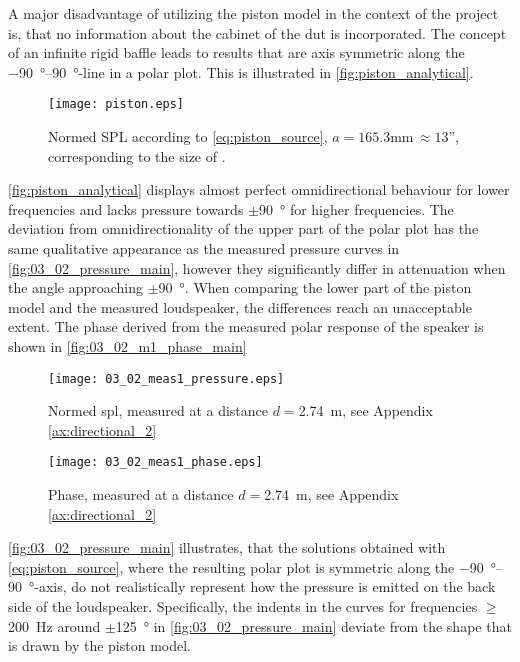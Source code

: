 A major disadvantage of utilizing the piston model in the context of the project is, that no information about the cabinet of the \gls{dut} is incorporated. The concept of an infinite rigid baffle leads to results that are axis symmetric along the \SIrange{-90}{90}{\degree}-line in a polar plot. This is illustrated in \autoref{fig:piston_analytical}.
\begin{figure}[H]
	\centering
	\texttt{[image: piston.eps]}
	\caption{Normed SPL according to \autoref{eq:piston_source}, $a=165.3$\si{\milli\meter}$\,\approx 13$'', corresponding to the size of \citep{seas33}.}
		\label{fig:piston_analytical}
\end{figure}
\autoref{fig:piston_analytical} displays almost perfect omnidirectional behaviour for lower frequencies and lacks pressure towards $\pm$\SI{90}{\degree} for higher frequencies. The deviation from omnidirectionality of the upper part of the polar plot has the same qualitative appearance as the measured pressure curves in \autoref{fig:03_02_pressure_main}, however they significantly differ in attenuation when the angle approaching $\pm$\SI{90}{\degree}. When comparing the lower part of the piston model and the measured loudspeaker, the differences reach an unacceptable extent. The phase derived from the measured polar response of the speaker is shown in  \autoref{fig:03_02_m1_phase_main}  
\begin{figure}[H]
	\centering
	\texttt{[image: 03\_02\_meas1\_pressure.eps]}
	\caption{Normed \gls{spl}, measured at a distance \(d=\)\SI{2.74}{\meter}, see Appendix \ref{ax:directional_2}}
		\label{fig:03_02_pressure_main}
\end{figure}

\begin{figure}[H]
	\centering
	\texttt{[image: 03\_02\_meas1\_phase.eps]}
	\caption{Phase, measured at a distance \(d=\)\SI{2.74}{\meter}, see Appendix \ref{ax:directional_2}}
		\label{fig:03_02_m1_phase_main}
\end{figure}

\autoref{fig:03_02_pressure_main} illustrates, that the solutions obtained with \autoref{eq:piston_source}, where the resulting polar plot is symmetric along the \SIrange{-90}{90}{\degree}-axis, do not realistically represent how the pressure is emitted on the back side of the loudspeaker. Specifically, the indents in the curves for frequencies $\ge$\SI{200}{\hertz} around $\pm$\SI{125}{\degree} in \autoref{fig:03_02_pressure_main} deviate from the shape that is drawn by the piston model. 

